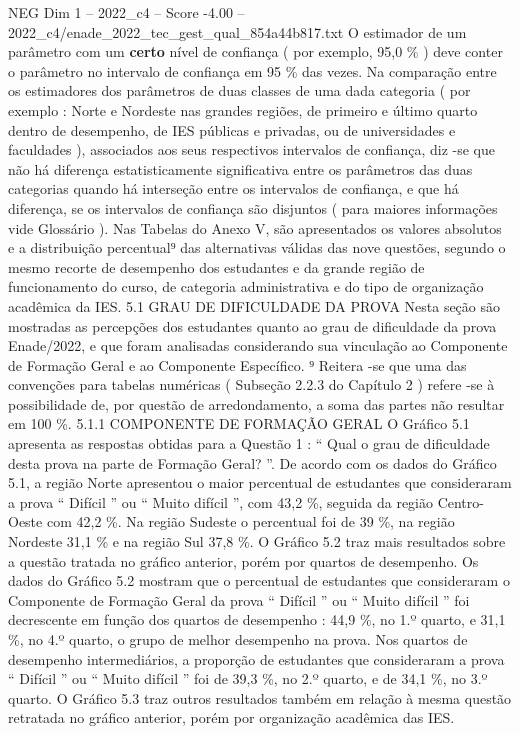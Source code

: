 \begin{textsample}{NEG Dim 1 – 2022\_c4 – Score -4.00 – 2022\_c4/enade\_2022\_tec\_gest\_qual\_854a44b817.txt}
O estimador de um parâmetro com um \textbf{certo} nível de confiança ( por exemplo, 95,0 \% ) deve conter o parâmetro no intervalo de confiança em 95 \% das vezes.
Na comparação entre os estimadores dos parâmetros de duas classes de uma dada categoria ( por exemplo : Norte e Nordeste nas grandes regiões, de primeiro e último quarto dentro de desempenho, de IES públicas e privadas, ou de universidades e faculdades ), associados aos seus respectivos intervalos de confiança, diz -se que não há diferença estatisticamente significativa entre os parâmetros das duas categorias quando há interseção entre os intervalos de confiança, e que há diferença, se os intervalos de confiança são disjuntos ( para maiores informações vide Glossário ).
Nas Tabelas do Anexo V, são apresentados os valores absolutos e a distribuição percentual⁹ das alternativas válidas das nove questões, segundo o mesmo recorte de desempenho dos estudantes e da grande região de funcionamento do curso, de categoria administrativa e do tipo de organização acadêmica da IES. 5.1 GRAU DE DIFICULDADE DA PROVA Nesta seção são mostradas as percepções dos estudantes quanto ao grau de dificuldade da prova Enade/2022, e que foram analisadas considerando sua vinculação ao Componente de Formação Geral e ao Componente Específico. ⁹ Reitera -se que uma das convenções para tabelas numéricas ( Subseção 2.2.3 do Capítulo 2 ) refere -se à possibilidade de, por questão de arredondamento, a soma das partes não resultar em 100 \%. 5.1.1 COMPONENTE DE FORMAÇÃO GERAL O Gráfico 5.1 apresenta as respostas obtidas para a Questão 1 : “ Qual o grau de dificuldade desta prova na parte de Formação Geral? ”.
De acordo com os dados do Gráfico 5.1, a região Norte apresentou o maior percentual de estudantes que consideraram a prova “ Difícil ” ou “ Muito difícil ”, com 43,2 \%, seguida da região Centro-Oeste com 42,2 \%.
Na região Sudeste o percentual foi de 39 \%, na região Nordeste 31,1 \% e na região Sul 37,8 \%.
O Gráfico 5.2 traz mais resultados sobre a questão tratada no gráfico anterior, porém por quartos de desempenho.
Os dados do Gráfico 5.2 mostram que o percentual de estudantes que consideraram o Componente de Formação Geral da prova “ Difícil ” ou “ Muito difícil ” foi decrescente em função dos quartos de desempenho : 44,9 \%, no 1.º quarto, e 31,1 \%, no 4.º quarto, o grupo de melhor desempenho na prova.
Nos quartos de desempenho intermediários, a proporção de estudantes que consideraram a prova “ Difícil ” ou “ Muito difícil ” foi de 39,3 \%, no 2.º quarto, e de 34,1 \%, no 3.º quarto.
O Gráfico 5.3 traz outros resultados também em relação à mesma questão retratada no gráfico anterior, porém por organização acadêmica das IES.

\end{textsample}
